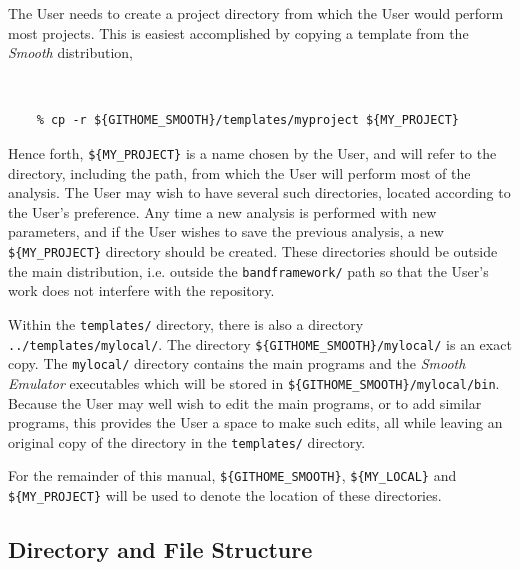 \documentclass[UserManual.tex]{subfiles}
\begin{document}
The User needs to create a project directory from which the User would perform most projects. This is easiest accomplished by copying a template from the {\it Smooth} distribution,
{\tt
\begin{verbatim}
    % cp -r ${GITHOME_SMOOTH}/templates/myproject ${MY_PROJECT}
\end{verbatim}
}
Hence forth, {\tt \$\{MY\_PROJECT\}} is a name chosen by the User, and will refer to the directory, including the path, from which the User will perform most of the analysis. The User may wish to have several such directories, located according to the User's preference. Any time a new analysis is performed with new parameters, and if the User wishes to save the previous analysis, a new {\tt \$\{MY\_PROJECT\}} directory should be created. These directories should be outside the main distribution, i.e. outside the {\tt bandframework/} path so that the User's work does not interfere with the repository. 

Within the {\tt templates/} directory, there is also a directory {\tt ../templates/mylocal/}. The directory {\tt \$\{GITHOME\_SMOOTH\}/mylocal/} is an exact copy. The {\tt mylocal/} directory contains the main programs and the {\it Smooth Emulator} executables which will be stored in {\tt \$\{GITHOME\_SMOOTH\}/mylocal/bin}. Because the User may well wish to edit the main programs, or to add similar programs, this provides the User a space to make such edits, all while leaving an original copy of the directory in the {\tt templates/} directory. 

For the remainder of this manual, {\tt \$\{GITHOME\_SMOOTH\}}, {\tt \$\{MY\_LOCAL\}} and {\tt \$\{MY\_PROJECT\}} will be used to denote the location of these directories.

\subsection{Directory and File Structure}
\end{document}
